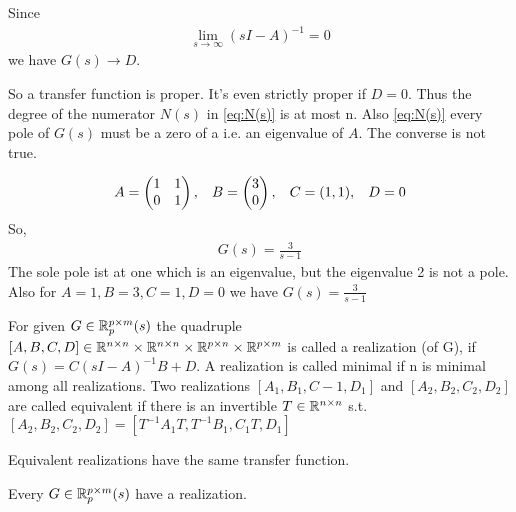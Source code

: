 Since 
\begin{align*}
	\lim\limits_{s \rightarrow \infty} (sI -A)^{-1} =0
\end{align*}
we have $G(s) \rightarrow D$.

So a transfer function is proper. It's even strictly proper if $D=0$. Thus the degree of the numerator $N(s)$ in \ref{eq:N(s)} is at most n. Also \ref{eq:N(s)} every pole of $G(s)$ must be a zero of a i.e. an eigenvalue of $A$. The converse is not true. 

\begin{exa}
	\begin{align*}
		A=\begin{pmatrix}
		1 & 1 \\ 0  & 1 
		\end{pmatrix}
		, \hspace{2ex}
		B = \begin{pmatrix}
		3 \\ 0
		\end{pmatrix}, \hspace{2ex}
		C=(1,1), \hspace{2ex} D=0 
	\end{align*}
	So,
	\begin{align*}
		G(s)=\frac{3}{s-1}
	\end{align*}
	The sole pole ist at one which is an eigenvalue, but the eigenvalue 2 is not a pole. Also for $A=1, B=3, C=1, D=0$ we have $G(s)=\frac{3}{s-1}$
\end{exa} 

\begin{defi}
	For given $G \in \mathbb{R}^{p \times m}_p(s)$ the quadruple $[A,B,C,D] \in \mathbb{R}^{n \times n} \times \mathbb{R}^{n \times n} \times \mathbb{R}^{p \times n} \times \mathbb{R}^{p \times m}$ is called a realization (of G), if $G(s)=C(sI-A)^{-1}B + D $. A realization is called minimal if n is minimal among all realizations. Two realizations $[A_1,B_1,C-1,D_1]$ and $[A_2,B_2,C_2,D_2]$  are called equivalent if there is an invertible $T \in \mathbb{R}^{n \times n}$ s.t. $[A_2,B_2,C_2,D_2]= [T^{-1}A_1 T, T^{-1}B_1,C_1T,D_1]$
\end{defi}

\begin{thm}
	Equivalent realizations have the same transfer function. 
\end{thm}

\begin{thm}
	Every $G \in \mathbb{R}^{p \times m}_p(s)$ have a realization. 
\end{thm}

